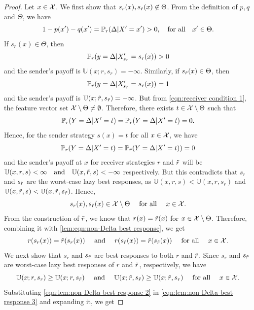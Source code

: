 \begin{proof}\label{proof:delta null wlog}
Let $x \in \mathcal{X}$. We first show that $s_r(x),s_{\tilde{r}}(x) \not\in \Theta$. From the definition of $p,q$ and $\Theta$, we have
    \[1-p(x')-q(x') =\mathbb{P}_r(\Delta|X' = x')  > 0, \hbox{\quad for all\quad} x' \in \Theta.\]
    \noindent If $s_r(x) \in \Theta$, then $$\mathbb{P}_r(y = \Delta|X'_{s_r}=s_r(x)) > 0$$ and the sender's payoff is $\mathbb{U}(x;r,s_r) = -\infty$.
    Similarly, if $s_{\tilde{r}}(x) \in \Theta$, then \[\mathbb{P}_{\tilde{r}}(y = \Delta|X'_{s_{\tilde{r}}} = s_{\tilde{r}}(x)) = 1 \] and the sender's payoff is $\mathbb{U}(x;\tilde{r},s_{\tilde{r}}) = -\infty$.
    But from \eqref{eqn:receiver condition 1}, the feature vector set $\mathcal{X}\setminus \Theta \neq \emptyset$. Therefore, there exists $t \in \mathcal{X}\setminus \Theta$ such that
        $$\mathbb{P}_r(Y = \Delta|X'=t) = \mathbb{P}_{\tilde{r}}(Y = \Delta|X'=t) = 0.$$
Hence, for the sender strategy $s(x) = t$ for all $x \in \mathcal{X}$, we have
    $$\mathbb{P}_r(Y=\Delta|X'=t) = \mathbb{P}_{\tilde{r}}(Y=\Delta|X'=t)) = 0$$ and
    the sender's payoff at $x$ for receiver strategies $r$ and $\tilde{r}$ will be $\mathbb{U}(x,r,s) < \infty\hbox{\quad and\quad} \mathbb{U}(x,\tilde{r},s) < -\infty$ respectively.
    But this contradicts that $s_r$ and $s_{\tilde{r}}$ are the worst-case lazy best responses, as $\mathbb{U}(x,r,s) < \mathbb{U}(x,r,s_r)$ and $\mathbb{U}(x,\tilde{r},s) < \mathbb{U}(x,\tilde{r},s_{\tilde{r}})$. Hence,
    \begin{equation}\label{lem:eqn:non-Delta best response}
        s_r(x), s_{\rt}(x) \in \cg{X} \setminus \Theta \text{ for all } x \in \cg{X}.
    \end{equation}
    From the construction of $\tilde{r}$, we know that $r(x) = \tilde{r}(x)$ for $x \in \mathcal{X} \setminus \Theta$. Therefore, combining it with \eqref{lem:eqn:non-Delta best response}, we get
    \begin{equation}\label{eqn:lem:non-Delta best response 2}
        r(s_r(x)) = \rt(s_r(x)) \text{ and } r(s_{\rt}(x)) = \rt(s_{\rt}(x)) \text{ for all } x \in \cg{X}.
    \end{equation}
    We next show that $s_r$ and $s_{\tilde{r}}$ are best responses to both $r$ and $\tilde{r}$. Since $s_r$ and $s_{\tilde{r}}$ are worst-case lazy best responses of $r$ and $\tilde{r}$, respectively, we have
    \begin{equation}\label{eqn:lem:non-Delta best response 3}
        \mathbb{U}(x;r,s_r) \geq \mathbb{U}(x;r,s_{\rt}) \text{ and } \mathbb{U}(x;\rt,s_{\rt}) \geq \mathbb{U}(x;\rt,s_r) \text{ for all } x \in \cg{X}.
    \end{equation}
    Substituting \eqref{eqn:lem:non-Delta best response 2} in \eqref{eqn:lem:non-Delta best response 3} and expanding it, we get




\end{proof}
